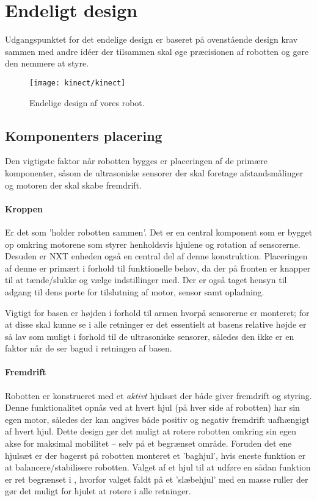 \section{Endeligt design}
Udgangspunktet for det endelige design er baseret på ovenstående design krav sammen med andre idéer der tilsammen skal øge præcisionen af robotten og gøre den nemmere at styre.

\begin{figure}
\centering
\texttt{[image: kinect/kinect]}
\caption{Endelige design af vores robot.}
\label{robot:opbygning}
\end{figure}

\subsection{Komponenters placering}

Den vigtigste faktor når robotten bygges er placeringen af de primære komponenter, såsom de ultrasoniske sensorer der skal foretage afstandsmålinger og motoren der skal skabe fremdrift.

\paragraph{Kroppen}
Er det som 'holder robotten sammen'.
Det er en central komponent som er bygget op omkring motorene som styrer henholdsvis hjulene og rotation af sensorerne.
Desuden er NXT enheden også en central del af denne konstruktion.
Placeringen af denne er primært i forhold til funktionelle behov, da der på fronten er knapper til at tænde/slukke og vælge indstillinger med.
Der er også taget hensyn til adgang til dens porte for tilslutning af motor, sensor samt opladning.

Vigtigt for basen er højden i forhold til armen hvorpå sensorerne er monteret; for at disse skal kunne se i alle retninger er det essentielt at basens relative højde er så lav som muligt i forhold til de ultrasoniske sensorer, således den ikke er en faktor når de ser bagud i retningen af basen. 

\paragraph{Fremdrift}
Robotten er konstrueret med et \textit{aktivt} hjulsæt der både giver fremdrift og styring.
Denne funktionalitet opnås ved at hvert hjul (på hver side af robotten) har sin egen motor, således der kan angives både positiv og negativ fremdrift uafhængigt af hvert hjul.
Dette design gør det muligt at rotere robotten omkring sin egen akse for maksimal mobilitet -- selv på et begrænset område.
Foruden det ene hjulsæt er der bagerst på robotten monteret et 'baghjul', hvis eneste funktion er at balancere/stabilisere robotten.
Valget af et hjul til at udføre en sådan funktion er ret begrænset i \lego, hvorfor valget faldt på et 'slæbehjul' med en masse ruller der gør det muligt for hjulet at rotere i alle retninger.

